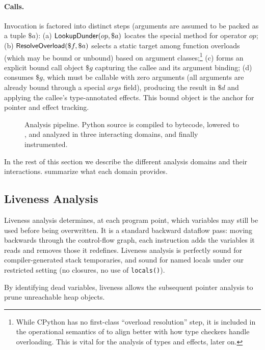 \paragraph{Calls.}
Invocation is factored into distinct steps (arguments are assumed to be packed as a tuple
$\$a$): (a) $\textsf{LookupDunder}(op,\$a)$ locates the special method
for operator $op$; (b) $\textsf{ResolveOverload}(\$f,\$a)$ selects a static target among function overloads (which may be bound or unbound) based on argument classes;\footnote{While CPython has no first-class ``overload resolution'' step, it is included in the operational semantics of \spytecode to align better with how type checkers handle overloading. This is vital for the analysis of types and effects, later on.}
(c) \tBind forms an explicit bound call object $\$g$ capturing the callee and its
argument binding; (d) \tCall consumes $\$g$, which must be callable with zero arguments (all arguments are already bound through a special $args$ field), producing the result in $\$d$ and applying the callee's type-annotated effects. This bound object is the anchor for
pointer and effect tracking.

\begin{figure}[t]
    \centering
    
    \caption{Analysis pipeline. Python source is compiled to bytecode, lowered to \spytecode, and analyzed in three interacting domains, and finally instrumented.}
    \label{fig:overview}
\end{figure}

In the rest of this section we describe the different analysis domains and their interactions.  summarize what each domain provides.

\subsection{Liveness Analysis}
\label{sec:liveness}
Liveness analysis determines, at each program point, which \spytecode variables may still be used before being overwritten.  
It is a standard backward dataflow pass: moving backwards through the control-flow graph, each instruction adds the variables it reads and removes those it redefines.  Liveness analysis is perfectly sound for compiler-generated stack temporaries, and sound for named locals under our restricted setting (no closures, no use of \texttt{locals()}).

By identifying dead variables, liveness allows the subsequent pointer analysis to prune unreachable heap objects.

